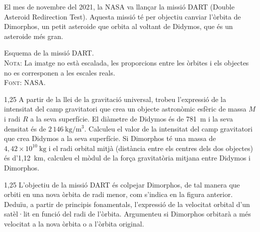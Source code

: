 El mes de novembre del 2021, la NASA va llançar la missió DART (Double Asteroid Redirection Test). Aquesta missió té per objectiu canviar l'òrbita de Dimorphos, un petit asteroide que orbita al voltant de Didymos, que és un asteroide més gran.

\begin{center}
\begin{minipage}{0.6\linewidth}\small
Esquema de la missió DART.\\
\textsc{Nota}: La imatge no està escalada, les proporcions entre les òrbites i els objectes no es corresponen a les escales reals.\\
\textsc{Font}: NASA.
\end{minipage}
\end{center}

\begin{apartat}{1,25}
A partir de la llei de la gravitació universal, trobeu l'expressió de la intensitat del camp gravitatori que crea un objecte astronòmic esfèric de massa $M$ i radi $R$ a la seva superfície. El diàmetre de Didymos és de 781~m i la seva densitat és de $2\,146\ \mathrm{kg/m^3}$. Calculeu el valor de la intensitat del camp gravitatori que crea Didymos a la seva superfície. Si Dimorphos té una massa de $4,42\times 10^{10}\ \mathrm{kg}$ i el radi orbital mitjà (distància entre els centres dels dos objectes) és d'1,12~km, calculeu el mòdul de la força gravitatòria mitjana entre Didymos i Dimorphos.
\end{apartat}

\begin{apartat}{1,25}
L'objectiu de la missió DART és colpejar Dimorphos, de tal manera que orbiti en una nova òrbita de radi menor, com s'indica en la figura anterior. Deduïu, a partir de principis fonamentals, l'expressió de la velocitat orbital d'un satèl·lit en funció del radi de l'òrbita. Argumenteu si Dimorphos orbitarà a més velocitat a la nova òrbita o a l'òrbita original.
\end{apartat}

